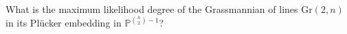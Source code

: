 What is the maximum likelihood degree of the Grassmannian of lines
 $\mathrm{Gr}(2,n)$ in its Pl\"ucker embedding in $\mathbb P^{\binom{n}{2}-1}$?

